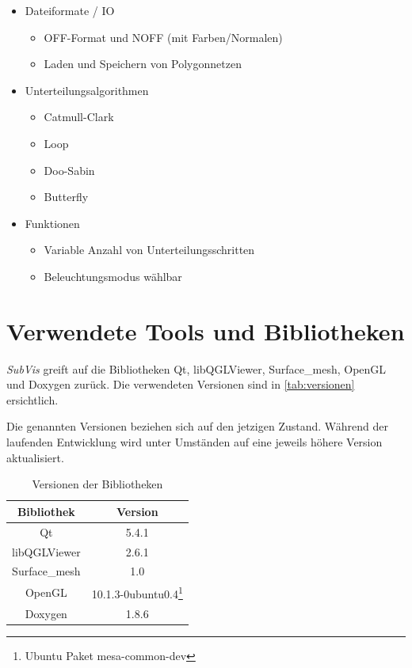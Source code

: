\begin{itemize}
\begin{itemize}
 \end{itemize}
 \item Dateiformate / IO
 \begin{itemize}
 	\item OFF-Format und NOFF (mit Farben/Normalen)
 	\item Laden und Speichern von Polygonnetzen
 \end{itemize}
 \item Unterteilungsalgorithmen
 \begin{itemize}
 	\item Catmull-Clark
 	\item Loop
 	\item Doo-Sabin
 	\item Butterfly
 \end{itemize}
 \item Funktionen
 \begin{itemize}
  \item Variable Anzahl von Unterteilungsschritten
  \item Beleuchtungsmodus wählbar
 \end{itemize}
\end{itemize}

\section{Verwendete Tools und Bibliotheken}

\emph{SubVis} greift auf die Bibliotheken Qt, libQGLViewer, Surface\_mesh, OpenGL und Doxygen zurück.
Die verwendeten Versionen sind in \autoref{tab:versionen} ersichtlich.

Die genannten Versionen beziehen sich auf den jetzigen Zustand. 
Während der laufenden Entwicklung wird unter Umständen auf eine jeweils höhere Version aktualisiert.

\begin{table}[h]
\center
\caption{Versionen der Bibliotheken}
\label{tab:versionen}
\begin{tabular}{c|c}
Bibliothek & Version\\
\hline
Qt & 5.4.1\\
libQGLViewer & 2.6.1\\
Surface\_mesh & 1.0\\
OpenGL & 10.1.3-0ubuntu0.4\footnote{Ubuntu Paket mesa-common-dev}\\
Doxygen & 1.8.6\\
\end{tabular}
\end{table}

